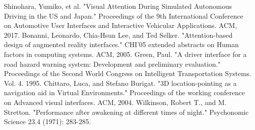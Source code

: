 \documentclass[a4paper, 11pt]{article}
\begin{document}
\begin{thebibliography}{9}
 Shinohara, Yumiko, et al. "Visual Attention During Simulated Autonomous Driving in the US and Japan." Proceedings of the 9th International Conference on Automotive User Interfaces and Interactive Vehicular Applications. ACM, 2017.
 Bonanni, Leonardo, Chia-Hsun Lee, and Ted Selker. "Attention-based design of augmented reality interfaces." CHI'05 extended abstracts on Human factors in computing systems. ACM, 2005.
 Green, Paul. "A driver interface for a road hazard warning system: Development and preliminary evaluation." Proceedings of the Second World Congress on Intelligent Transportation Systems. Vol. 4. 1995.
 Chittaro, Luca, and Stefano Burigat. "3D location-pointing as a navigation aid in Virtual Environments." Proceedings of the working conference on Advanced visual interfaces. ACM, 2004.
 Wilkinson, Robert T., and M. Stretton. "Performance after awakening at different times of night." Psychonomic Science 23.4 (1971): 283-285.
\end{thebibliography}
\end{document}
